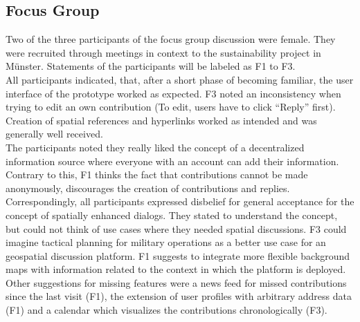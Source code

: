 \subsection{Focus Group}
\label{sub:ev_focus}
Two of the three participants of the focus group discussion were female. They were recruited through meetings in context to the sustainability project in Münster. Statements of the participants will be labeled as F1 to F3.\\
All participants indicated, that, after a short phase of becoming familiar, the user interface of the prototype worked as expected. F3 noted an inconsistency when trying to edit an own contribution (To edit, users have to click ``Reply'' first). Creation of spatial references and hyperlinks worked as intended and was generally well received.\\
The participants noted they really liked the concept of a decentralized information source where everyone with an account can add their information. Contrary to this, F1 thinks the fact that contributions cannot be made anonymously, discourages the creation of contributions and replies.\\
Correspondingly, all participants expressed disbelief for general acceptance for the concept of spatially enhanced dialogs. They stated to understand the concept, but could not think of use cases where they needed spatial discussions. F3 could imagine tactical planning for military operations as a better use case for an geospatial discussion platform. F1 suggests to integrate more flexible background maps with information related to the context in which the platform is deployed. Other suggestions for missing features were a news feed for missed contributions since the last visit (F1), the extension of user profiles with arbitrary address data (F1) and a calendar which visualizes the contributions chronologically (F3).



